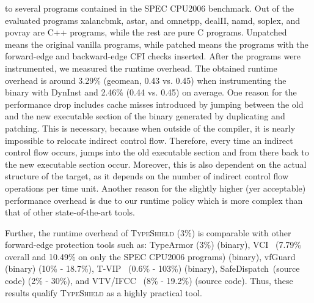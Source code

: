 to several programs contained in the SPEC CPU2006 benchmark. 
Out of the evaluated programs xalancbmk, astar, and omnetpp, dealII, namd, soplex, and povray are C++ programs, while the rest are pure C programs. 
Unpatched means the original vanilla programs, while patched means the programs with the forward-edge and backward-edge CFI checks inserted.
After the programs were instrumented, we measured the runtime overhead.
The obtained runtime overhead is around 3.29\% (geomean,  0.43 vs. 0.45) when instrumenting the binary with DynInst and 2.46\% (0.44 vs. 0.45) on average.
One reason for the performance drop includes cache misses introduced by jumping between the old and the new executable section 
of the binary generated by duplicating and patching. This is necessary, because when
outside of the compiler, it is nearly impossible to relocate indirect control flow. Therefore, 
every time an indirect control flow occurs, jumps into the old executable section and from 
there back to the new executable section occur. Moreover, this is also dependent on the actual structure 
of the target, as it depends on the number of indirect control flow operations per time unit.
Another reason for the slightly higher (yer acceptable) performance overhead is due to our
runtime policy which is more complex than that of other state-of-the-art tools.

Further, the runtime overhead of \textsc{TypeShield} (3\%) is comparable with other forward-edge protection
tools such as: TypeArmor (3\%) (binary), VCI~\cite{vci:asiaccs} (7.79\% overall and 10.49\% on only the SPEC CPU2006 programs) (binary), 
vfGuard~\cite{vfuard:aravind} (binary) (10\% - 18.7\%), T-VIP~\cite{gawlik} (0.6\% - 103\%) (binary), 
SafeDispatch~\cite{safedispatch:jang}(source code) (2\% - 30\%), and VTV/IFCC~\cite{vtv:tice} (8\% - 19.2\%) (source code).
Thus, these results qualify \textsc{TypeShield} as a highly practical tool.


